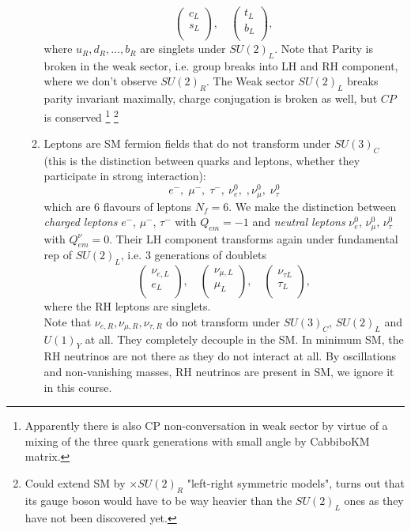 \begin{enumerate}
\begin{enumerate}
\begin{equation*}
\begin{pmatrix}
	c_L\\
	s_L\\
\end{pmatrix},\quad 
\begin{pmatrix}
	t_L \\
	b_L\\
\end{pmatrix},
\end{equation*}
where $u_R,d_R,\dots,b_R$ are singlets under $SU(2)_L$. Note that Parity is broken in the weak sector, i.e. group breaks into LH and RH component, where we don't observe $SU(2)_R$. The Weak sector $SU(2)_L$ breaks parity invariant maximally, charge conjugation is broken as well, but $CP$ is conserved \footnote{Apparently there is also CP non-conversation in weak sector by virtue of a mixing of the three quark generations with small angle by CabbiboKM matrix.}
\footnote{Could extend SM by $\times SU(2)_R$ "left-right symmetric models", turns out that its gauge boson would have to be way heavier than the $SU(2)_L$ ones as they have not been discovered yet.}
\item Leptons are SM fermion fields that do not transform under $SU(3)_C$ (this is the distinction between quarks and leptons, whether they participate in strong interaction):
\begin{equation*}
	e^-,\; \mu^-,\; \tau^-,\: \nu^0_e,\;, \nu^0_\mu,\; \nu^0_\tau
\end{equation*}
which are $6$ flavours of leptons $N_f=6$. We make the distinction between \emph{charged leptons} $e^-$, $\mu^-$, $\tau^-$ with $Q_{em}=-1$ and \emph{neutral leptons} $\nu^0_e$, $\nu^0_\mu$, $\nu^0_\tau$ with $Q^\nu_{em}=0$. Their LH component transforms again under fundamental rep of $SU(2)_L$, i.e. $3$ generations of doublets
\begin{equation*}
	\begin{pmatrix}
		\nu_{e,L} \\
		e_L\\
	\end{pmatrix},\quad 
\begin{pmatrix}
	\nu_{\mu,L} \\
	\mu_L\\
\end{pmatrix}, \quad 
\begin{pmatrix}
	\nu_{\tau L} \\
	\tau_L\\
\end{pmatrix},
\end{equation*}
where the RH leptons are singlets.\\
Note that $\nu_{e,R},\nu_{\mu,R},\nu_{\tau,R}$ do not transform under $SU(3)_C$, $SU(2)_L$ and $U(1)_Y$ at all. They completely decouple in the SM. In minimum SM, the RH neutrinos are not there as they do not interact at all. By oscillations and non-vanishing masses, RH neutrinos are present in SM, we ignore it in this course.
\end{enumerate} 
\end{enumerate}
